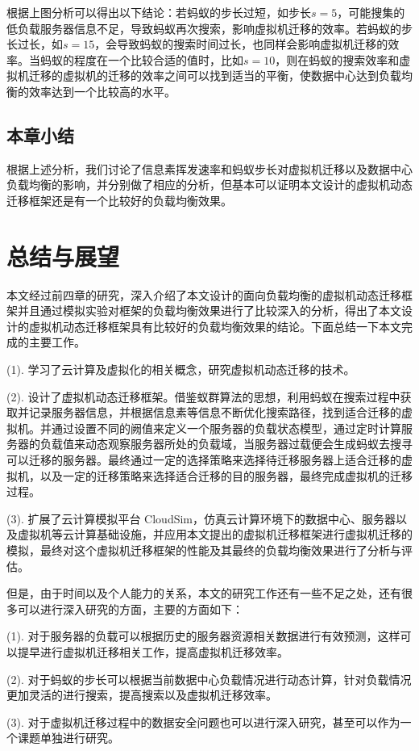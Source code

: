 根据上图分析可以得出以下结论：若蚂蚁的步长过短，如步长$ s = 5 $，可能搜集的低负载服务器信息不足，导致蚂蚁再次搜索，影响虚拟机迁移的效率。若蚂蚁的步长过长，如$ s = 15 $，会导致蚂蚁的搜索时间过长，也同样会影响虚拟机迁移的效率。当蚂蚁的程度在一个比较合适的值时，比如$ s = 10 $，则在蚂蚁的搜索效率和虚拟机迁移的虚拟机的迁移的效率之间可以找到适当的平衡，使数据中心达到负载均衡的效率达到一个比较高的水平。

 \section{本章小结}
根据上述分析，我们讨论了信息素挥发速率和蚂蚁步长对虚拟机迁移以及数据中心负载均衡的影响，并分别做了相应的分析，但基本可以证明本文设计的虚拟机动态迁移框架还是有一个比较好的负载均衡效果。

\chapter{总结与展望}
本文经过前四章的研究，深入介绍了本文设计的面向负载均衡的虚拟机动态迁移框架并且通过模拟实验对框架的负载均衡效果进行了比较深入的分析，得出了本文设计的虚拟机动态迁移框架具有比较好的负载均衡效果的结论。下面总结一下本文完成的主要工作。

    (1). 学习了云计算及虚拟化的相关概念，研究虚拟机动态迁移的技术。
    
    (2). 设计了虚拟机动态迁移框架。借鉴蚁群算法的思想，利用蚂蚁在搜索过程中获取并记录服务器信息，并根据信息素等信息不断优化搜索路径，找到适合迁移的虚拟机。并通过设置不同的阙值来定义一个服务器的负载状态模型，通过定时计算服务器的负载值来动态观察服务器所处的负载域，当服务器过载便会生成蚂蚁去搜寻可以迁移的服务器。最终通过一定的选择策略来选择待迁移服务器上适合迁移的虚拟机，以及一定的迁移策略来选择适合迁移的目的服务器，最终完成虚拟机的迁移过程。

    (3). 扩展了云计算模拟平台 CloudSim，仿真云计算环境下的数据中心、服务器以及虚拟机等云计算基础设施，并应用本文提出的虚拟机迁移框架进行虚拟机迁移的模拟，最终对这个虚拟机迁移框架的性能及其最终的负载均衡效果进行了分析与评估。

但是，由于时间以及个人能力的关系，本文的研究工作还有一些不足之处，还有很多可以进行深入研究的方面，主要的方面如下：

    (1). 对于服务器的负载可以根据历史的服务器资源相关数据进行有效预测，这样可以提早进行虚拟机迁移相关工作，提高虚拟机迁移效率。

    (2). 对于蚂蚁的步长可以根据当前数据中心负载情况进行动态计算，针对负载情况更加灵活的进行搜索，提高搜索以及虚拟机迁移效率。
    
    (3). 对于虚拟机迁移过程中的数据安全问题也可以进行深入研究，甚至可以作为一个课题单独进行研究。



























